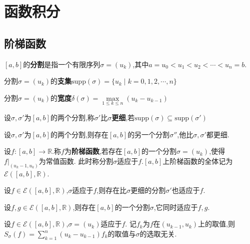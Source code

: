 \chapter{函数积分}

\section{阶梯函数}

\begin{deff}
    $[a,b]$的\textbf{分割}是指一个有限序列$\sigma=(u_k)$,其中$a=u_0<u_1<u_2<\cdots<u_n=b$.
\end{deff}

\begin{deff}
    分割$\sigma=(u_k)$的\textbf{支集}$\mathrm{supp}(\sigma)=\{u_k \mid k=0,1,2,\cdots,n\}$
\end{deff}

\begin{deff}
    分割$\sigma=(u_k)$的\textbf{宽度}$\delta(\sigma)=\max\limits_{1 \leqslant k \leqslant n}(u_k-u_{k-1})$
\end{deff}

\begin{deff}
    设$\sigma,\sigma'$为$[a,b]$的两个分割,称$\sigma'$比$\sigma$\textbf{更细},若$\mathrm{supp}(\sigma)\subseteq\mathrm{supp}(\sigma')$
\end{deff}

\begin{prop}
    设$\sigma,\sigma'$为$[a,b]$的两个分割,则存在$[a,b]$的另一个分割$\sigma''$,他比$\sigma,\sigma'$都更细.
\end{prop}

\begin{deff}
    设$f:[a,b]\to\mathbb{R}$.称$f$为\textbf{阶梯函数},若存在$[a,b]$的一个分割$\sigma=(u_k)$,使得$f\vert_{(u_k-1,u_k)}$为常值函数.
    此时称分割$\sigma$适应于$f$.$[a,b]$上阶梯函数的全体记为$\mathcal{E}([a,b],\mathbb{R})$.
\end{deff}

\begin{prop}
    设$f\in\mathcal{E}([a,b],\mathbb{R})$,$\sigma$适应于$f$,则存在比$\sigma$更细的分割$\sigma'$也适应于$f$.
\end{prop}

\begin{prop}
    设$f,g\in\mathcal{E}([a,b],\mathbb{R})$,则存在$[a,b]$的一个分割$\sigma$,它同时适应于$f,g$.
\end{prop}

\begin{prop}
    设$f\in\mathcal{E}([a,b],\mathbb{R})$,$\sigma=(u_k)$适应于$f$.
    记$f_k$为$f$在$(u_{k-1},u_k)$上的取值,则$S_\sigma(f)=\sum\limits_{k=1}^n(u_{k}-u_{k-1})f_k$的取值与$\sigma$的选取无关.
\end{prop}

